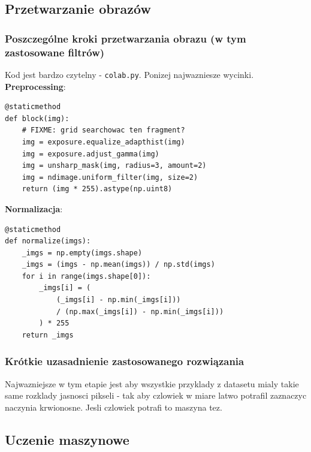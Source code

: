 \documentclass{bmvc2k}
\begin{document}
\subsection{Przetwarzanie obrazów}

\subsubsection{Poszczególne kroki przetwarzania obrazu (w tym zastosowane filtrów)}

Kod jest bardzo czytelny - {\tt colab.py}. Ponizej najwazniesze wycinki.
\textbf{Preprocessing}:

\begin{verbatim}
@staticmethod
def block(img):
	# FIXME: grid searchowac ten fragment?
	img = exposure.equalize_adapthist(img)
	img = exposure.adjust_gamma(img)
	img = unsharp_mask(img, radius=3, amount=2)
	img = ndimage.uniform_filter(img, size=2)
	return (img * 255).astype(np.uint8)
\end{verbatim}

\textbf{Normalizacja}:

\begin{verbatim}
@staticmethod
def normalize(imgs):
	_imgs = np.empty(imgs.shape)
	_imgs = (imgs - np.mean(imgs)) / np.std(imgs)
	for i in range(imgs.shape[0]):
		_imgs[i] = (
			(_imgs[i] - np.min(_imgs[i]))
			/ (np.max(_imgs[i]) - np.min(_imgs[i]))
		) * 255
	return _imgs
\end{verbatim}

\subsubsection{Krótkie uzasadnienie zastosowanego rozwiązania}

Najwazniejsze w tym etapie jest aby wszystkie przyklady z datasetu mialy takie
same rozklady jasnosci pikseli - tak aby czlowiek w miare latwo potrafil
zaznaczyc naczynia krwionosne. Jesli czlowiek potrafi to maszyna tez.

\subsection{Uczenie maszynowe}
\end{document}
